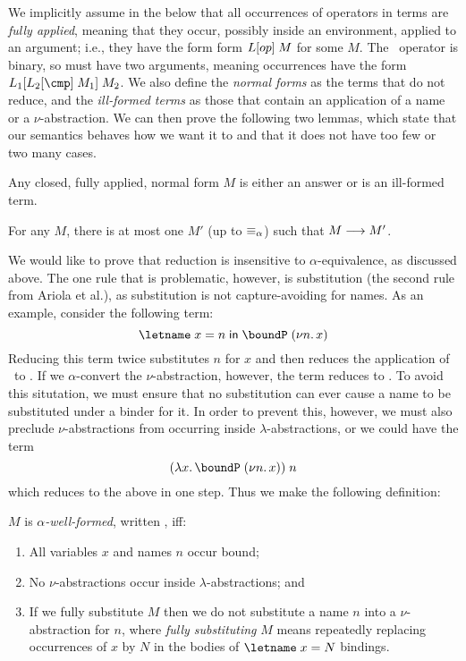 \documentclass[natbib]{sigplanconf}
\begin{document}
We implicitly assume in the below that all occurrences of operators in
terms are \emph{fully applied}, meaning that they occur, possibly
inside an environment, applied to an argument; i.e., they have the
form form $L[op]\;M$ for some $M$. The \cmp\ operator is
binary, so must have two arguments, meaning occurrences have the form
$\tctxt{L_1}{\tctxt{L_2}{\cmp}\;M_1}\;M_2$.  We also define the
\emph{normal forms} as the terms that do not reduce, and the
\emph{ill-formed terms} as those that contain an application of a name
or a $\nu$-abstraction. We can then prove the following two lemmas,
which state that our semantics behaves how we want it to and that it
does not have too few or two many cases.

\begin{lemma}
  Any closed, fully applied, normal form $M$ is either an answer or is
  an ill-formed term.
\end{lemma}

\begin{lemma}[Determinism]
  For any $M$, there is at most one $M'$ (up to $\equiv_{\alpha}$) such that
  $M\longrightarrow M'$.
\end{lemma}


We would like to prove that reduction is insensitive to
$\alpha$-equivalence, as discussed above. The one rule that is
problematic, however, is substitution (the second rule from Ariola et
al.), as substitution is not capture-avoiding for names. As an
example, consider the following term:
\[
\lete{x}{n}{\boundP\;(\nuabs{n}{x})}
\]
Reducing this term twice substitutes $n$ for $x$ and then reduces the
application of \boundP\ to \True. If we $\alpha$-convert the
$\nu$-abstraction, however, the term reduces to \False.
To avoid this situtation, we must ensure that no substitution can
ever cause a name to be substituted under a binder for it.
In order to prevent this, however, we must also preclude
$\nu$-abstractions from occurring inside $\lambda$-abstractions,
or we could have the term
\[
(\lamabsnot{x}{\boundP\;(\nuabs{n}{x})})\;n
\]
which reduces to the above in one step.  Thus we make the following
definition:

\begin{definition}
  $M$ is \emph{$\alpha$-well-formed}, written , iff:
  \begin{enumerate}
  \item All variables $x$ and names $n$ occur bound;
  \item No $\nu$-abstractions occur inside $\lambda$-abstractions; and
  \item If we fully substitute $M$ then we do not substitute
    a name $n$ into a $\nu$-abstraction for $n$, where
    \emph{fully substituting} $M$ means repeatedly replacing occurrences
    of $x$ by $N$ in the bodies of $\letname\;x=N$ bindings.
  \end{enumerate}
\end{definition}
\end{document}
